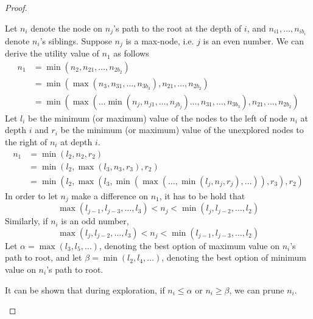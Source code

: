 \begin{exercise}[Search]
\begin{proof}
\begin{itemize}
    Let $n_i$ denote the node on $n_j$'s path to the root at the depth of $i$, and $n_{i1},\ldots,n_{ib_i}$ denote $n_i$'s siblings. Suppose $n_j$ is a max-node, i.e. $j$ is an even number. We can derive the utility value of $n_1$ as follows
    \begin{equation}
      \begin{aligned}
        n_1 &= \min (n_2, n_{21}, \ldots, n_{2b_2}) \\
        &= \min(\max(n_3, n_{31}, \ldots, n_{3b_3}), n_{21}, \ldots, n_{2b_2}  ) \\
        &= \min(\max(\ldots \min(n_j, n_{j1},\ldots, n_{jb_j}) \ldots , n_{31}, \ldots, n_{3b_3}), n_{21}, \ldots, n_{2b_2}  ) 
      \end{aligned}
    \end{equation}
    Let $l_{i}$ be the minimum (or maximum) value of the nodes to the left of node $n_{i}$ at depth $i$ and $r_{i}$ be the minimum (or maximum) value of the unexplored nodes to the right of $n_{i}$ at depth $i .$
    \begin{equation}
      \begin{aligned}
        n_1 &= \min (l_2, n_2, r_2) \\
        &= \min (l_2, \max(l_3,n_3,r_3), r_2) \\
        &= \min (l_2, \max(l_3,\min(\max(\ldots,\min(l_j,n_j,r_j) ,\ldots)),r_3), r_2) 
      \end{aligned}
    \end{equation}
    In order to let $n_j$ make a difference on $n_1$, it has to be hold that
    \begin{equation}
      \max(l_{j-1},l_{j-3},\ldots,l_3) < n_j < \min(l_j, l_{j-2},\ldots,l_2)
    \end{equation}
    Similarly, if $n_i$ is an odd number, 
    \begin{equation}
      \max(l_{j},l_{j-2},\ldots,l_3) < n_j < \min(l_{j-1}, l_{j-3},\ldots,l_2)
    \end{equation}
    Let $\alpha = \max(l_{3},l_{5},\ldots)$, denoting the best option of maximum value on $n_i$'s path to root, and let $\beta = \min(l_2, l_4, \ldots)$, denoting the best option of minimum value on $n_i$'s path to root. 
    
    It can be shown that during exploration, if $n_i \le \alpha$ or $n_i \ge \beta$, we can prune $n_i$.

  \end{itemize}
  \end{proof}
  \label{ex4}
\end{exercise}